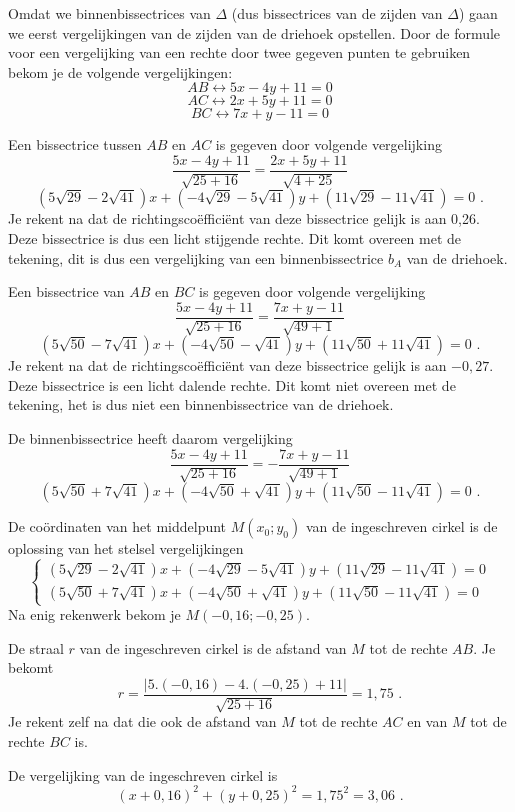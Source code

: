 Omdat we binnenbissectrices van $\Delta$ (dus bissectrices van de zijden van $\Delta$) gaan we eerst vergelijkingen van de zijden van de driehoek opstellen.
Door de formule voor een vergelijking van een rechte door twee gegeven punten te gebruiken bekom je de volgende vergelijkingen:
\[
AB \leftrightarrow 5x-4y+11=0
\]
\[
AC \leftrightarrow 2x+5y+11=0
\]
\[
BC \leftrightarrow 7x+y-11=0
\]

Een bissectrice tussen $AB$ en $AC$ is gegeven door volgende vergelijking
\[
\frac {5x-4y+11}{\sqrt {25+16}}=\frac {2x+5y+11}{\sqrt {4+25}}
\]
\[
(5\sqrt {29}-2\sqrt{41})x+(-4\sqrt{29}-5\sqrt{41})y+(11\sqrt{29}-11\sqrt{41})=0 \text { .}
\]
Je rekent na dat de richtingsco\"effici\"ent van deze bissectrice gelijk is aan 0,26.
Deze bissectrice is dus een licht stijgende rechte.
Dit komt overeen met de tekening, dit is dus een vergelijking van een binnenbissectrice $b_A$ van de driehoek.

Een bissectrice van $AB$ en $BC$ is gegeven door volgende vergelijking
\[
\frac {5x-4y+11}{\sqrt {25+16}}=\frac {7x+y-11}{\sqrt {49+1}}
\]
\[
(5\sqrt {50}-7\sqrt {41})x+(-4\sqrt {50}-\sqrt {41})y+(11 \sqrt{50}+11\sqrt {41})=0 \text { .}
\]
Je rekent na dat de richtingsco\"effici\"ent van deze bissectrice gelijk is aan $-0,27$.
Deze bissectrice is een licht dalende rechte.
Dit komt niet overeen met de tekening, het is dus niet een binnenbissectrice van de driehoek.

De binnenbissectrice heeft daarom vergelijking
\[
\frac {5x-4y+11}{\sqrt {25+16}}=-\frac {7x+y-11}{\sqrt {49+1}}
\]
\[
(5\sqrt {50}+7\sqrt {41})x+(-4\sqrt {50}+\sqrt {41})y+(11 \sqrt{50}-11\sqrt {41})=0 \text { .}
\]

De co\"ordinaten van het middelpunt $M(x_0;y_0)$ van de ingeschreven cirkel is de oplossing van het stelsel vergelijkingen
\[
\begin{cases}
(5\sqrt {29}-2\sqrt{41})x+(-4\sqrt{29}-5\sqrt{41})y+(11\sqrt{29}-11\sqrt{41})=0 \\
(5\sqrt {50}+7\sqrt {41})x+(-4\sqrt {50}+\sqrt {41})y+(11 \sqrt{50}-11\sqrt {41})=0
\end{cases}
\]
Na enig rekenwerk bekom je $M(-0,16;-0,25)$.

De straal $r$ van de ingeschreven cirkel is de afstand van $M$ tot de rechte $AB$.
Je bekomt
\[
r=\frac {\vert 5.(-0,16)-4.(-0,25)+11 \vert }{\sqrt {25+16}}=1,75 \text { .}
\]
Je rekent zelf na dat die ook de afstand van $M$ tot de rechte $AC$ en van $M$ tot de rechte $BC$ is.

De vergelijking van de ingeschreven cirkel is
\[
(x+0,16)^2+(y+0,25)^2=1,75^2=3,06 \text { .}
\]
